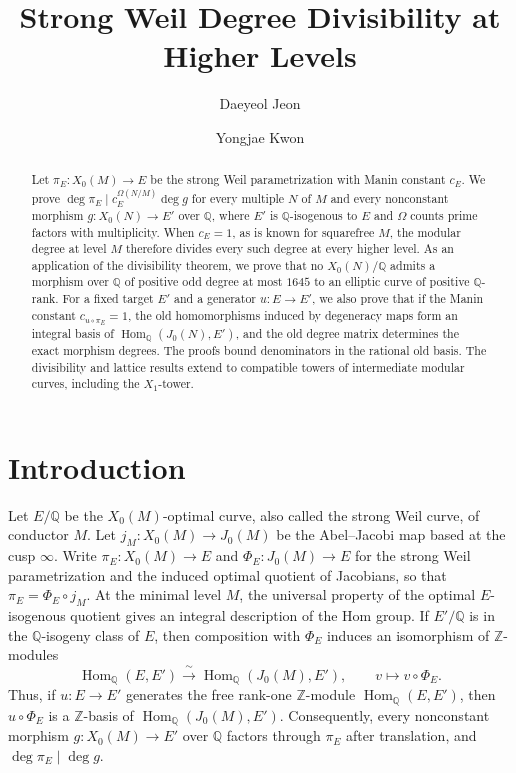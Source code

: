\documentclass[12pt, letterpaper]{amsart}
\title{Strong Weil Degree Divisibility at Higher Levels}
\author{Daeyeol Jeon}
\author{Yongjae Kwon}
\date{}
\theoremstyle{definition}
\theoremstyle{remark}
\newcommand{\Q}{\mathbb Q}
\newcommand{\Z}{\mathbb Z}
\newcommand{\Hom}{\operatorname{Hom}}
\numberwithin{equation}{section}
\begin{document}
\begin{abstract}
Let \(\pi_E:X_0(M)\to E\) be the strong Weil parametrization with Manin
constant \(c_E\). We prove \(\deg\pi_E\mid c_E^{\Omega(N/M)}\deg g\) for
every multiple \(N\) of \(M\) and every nonconstant morphism
\(g:X_0(N)\to E'\) over \(\Q\), where \(E'\) is \(\Q\)-isogenous to \(E\)
and \(\Omega\) counts prime factors with multiplicity.
When \(c_E=1\), as is known for squarefree \(M\), the modular degree at
level \(M\) therefore divides every such degree at every higher level.
As an application of the divisibility theorem, we prove that no
\(X_0(N)/\Q\) admits a morphism over \(\Q\) of positive odd degree at most
\(1645\) to an elliptic curve of positive \(\Q\)-rank.
For a fixed target \(E'\) and a generator \(u:E\to E'\), we also prove that
if the Manin constant \(c_{u\circ\pi_E}=1\), the old homomorphisms induced by
degeneracy maps form an integral basis of \(\Hom_\Q(J_0(N),E')\), and the
old degree matrix determines the exact morphism degrees.
The proofs bound denominators in the rational old basis.
The divisibility and lattice results extend to compatible towers of
intermediate modular curves, including the \(X_1\)-tower.
\end{abstract}

\maketitle


\section{Introduction}
Let \(E/\Q\) be the \(X_0(M)\)-optimal curve, also called the strong Weil curve,
of conductor \(M\). Let \(j_M:X_0(M)\to J_0(M)\) be the Abel--Jacobi map based
at the cusp \(\infty\). Write \(\pi_E:X_0(M)\to E\) and
\(\Phi_E:J_0(M)\to E\) for the strong Weil parametrization and the induced optimal quotient of
Jacobians, so that \(\pi_E=\Phi_E\circ j_M\). At the minimal level \(M\), the
universal property of the optimal \(E\)-isogenous quotient
\cite{DerickxOrlic} gives an integral
description of the Hom group. If \(E'/\Q\) is in the
\(\Q\)-isogeny class of \(E\), then composition with \(\Phi_E\) induces an
isomorphism of \(\Z\)-modules
\begin{equation}\label{eq:intro-level-M-hom}
        \Hom_\Q(E,E')
        \xrightarrow{\ \sim\ }
        \Hom_\Q(J_0(M),E'),
        \qquad
        v\longmapsto v\circ\Phi_E .
\end{equation}
Thus, if \(u:E\to E'\) generates the free rank-one
\(\Z\)-module \(\Hom_\Q(E,E')\),
then \(u\circ\Phi_E\) is a \(\Z\)-basis of
\(\Hom_\Q(J_0(M),E')\).
Consequently, every nonconstant morphism \(g:X_0(M)\to E'\) over
\(\Q\) factors through \(\pi_E\) after translation, and
\(\deg\pi_E\mid\deg g\).
\end{document}
